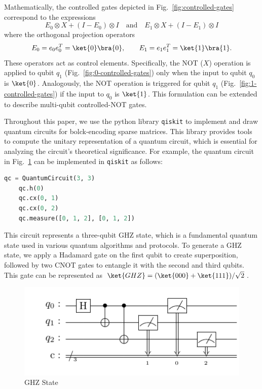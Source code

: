 \documentclass{article}
\begin{document}
    Mathematically, the controlled gates depicted in Fig.~\ref{fig:controlled-gates} correspond to the expressions
    \begin{equation}
        E_0 \otimes X + (I - E_0) \otimes I \quad \text{and} \quad E_1 \otimes X + (I - E_1) \otimes I
    \end{equation}
    where the orthogonal projection operators
    \begin{equation}
        E_0 = e_0 e_0^T = \ket{0} \bra{0}, \qquad E_1 = e_1 e_1^T = \ket{1}\bra{1}.
    \end{equation}
    These operators act as control elements.
    Specifically, the NOT ($X$) operation is applied to qubit $q_1$ (Fig.~\ref{fig:0-controlled-gates}) only when the input to qubit $q_0$ is $\ket{0}$. Analogously, the NOT operation is triggered for qubit $q_1$ (Fig.~\ref{fig:1-controlled-gates}) if the input to $q_0$ is $\ket{1}$.
    This formulation can be extended to describe multi-qubit controlled-NOT gates.

    Throughout this paper, we use the python library \texttt{qiskit} \cite{wille2019ibm} to implement and draw quantum circuits for bolck-encoding sparse matrices.
    This library provides tools to compute the unitary representation of a quantum circuit, which is essential for analyzing the circuit's theoretical significance.
    For example, the quantum circuit in Fig.~\ref{fig:circuit1} can be implemented in \texttt{qiskit} as follows:

    \begin{lstlisting}[language=Python, label={lst:ghz-circuit}]
    qc = QuantumCircuit(3, 3)
    qc.h(0)
    qc.cx(0, 1)
    qc.cx(0, 2)
    qc.measure([0, 1, 2], [0, 1, 2])
    \end{lstlisting}

    This circuit represents a three-qubit GHZ state, which is a fundamental quantum state used in various quantum algorithms and protocols.
    To generate a GHZ state, we apply a Hadamard gate on the first qubit to create superposition, followed by two CNOT gates to entangle it with the second and third qubits.
    This gate can be represented as $\ket{GHZ} = (\ket{000}+\ket{111})/\sqrt{2}$.

    \begin{figure}[htbp]
        \centering
        \includegraphics{pdf/example}
        \caption{
            GHZ State
        }
        \label{fig:circuit1}
    \end{figure}
\end{document}
